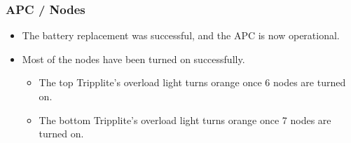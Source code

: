 \documentclass{beamer}
\begin{document}
\begin{frame}
  \frametitle{APC / Nodes}

  \begin{itemize}
  \item The battery replacement was successful, and the APC is now operational.
  \item Most of the nodes have been turned on successfully.
    \begin{itemize}
    \item The top Tripplite's overload light turns orange once 6 nodes are turned on. 
    \item The bottom Tripplite's overload light turns orange once 7 nodes are turned on.  
    \end{itemize}    
  \end{itemize}

\end{frame}

\end{document}

